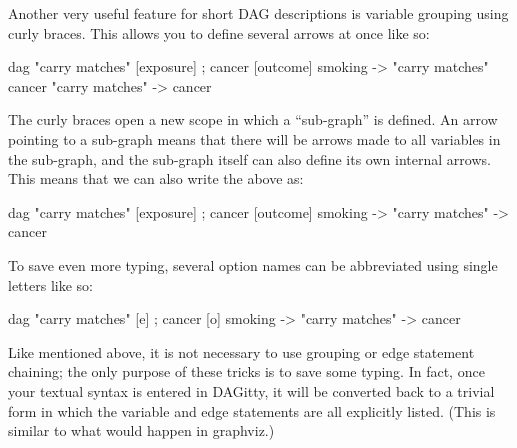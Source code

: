 \documentclass[a4paper]{article} %
\newcommand{\pp}{{\sc DAG}itty\xspace}
\begin{document}
Another very useful feature for short DAG descriptions is variable grouping using curly braces. This allows you to define several arrows at once like so:
\begin{dagcode}
dag{
  "carry matches" [exposure] ; cancer [outcome]
  smoking -> {"carry matches" cancer}
   "carry matches" -> cancer
}
\end{dagcode}

The curly braces open a new scope in which a ``sub-graph'' is defined. An arrow pointing to a sub-graph means that there will be arrows made to all variables in the sub-graph, and the sub-graph itself can also define its own internal arrows. This means that we can also write the above as:
\begin{dagcode}
dag{
  "carry matches" [exposure] ; cancer [outcome]
  smoking -> {"carry matches" -> cancer}
}
\end{dagcode}

To save even more typing, several option names can be abbreviated using single letters like so:
\begin{dagcode}
dag{
  "carry matches" [e] ; cancer [o]
  smoking -> {"carry matches" -> cancer}
}
\end{dagcode}

Like mentioned above, it is not necessary to use grouping or edge statement chaining; the only purpose of these tricks is to save some typing. In fact, once your textual syntax is entered in \pp, it will be converted back to a trivial form in which the variable and edge statements are all explicitly listed. (This is similar to what would happen in graphviz.)
\end{document}
